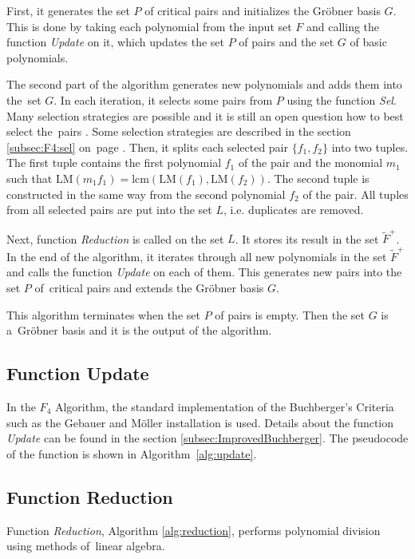 First, it generates the set $P$ of critical pairs and initializes the Gr\"obner basis $G$. This is done by taking each polynomial from the input set $F$ and calling the function \textit{Update} on it, which updates the set $P$ of pairs and the set $G$ of basic polynomials.

The second part of the algorithm generates new polynomials and adds them into the~set $G$. In each iteration, it selects some pairs from $P$ using the function \textit{Sel}. Many selection strategies are possible and it is still an open question how to best select the~pairs \cite{F4}. Some selection strategies are described in the section \ref{subsec:F4:sel} on~page \pageref{subsec:F4:sel}. Then, it splits each selected pair $\{f_1, f_2\}$ into two tuples. The first tuple contains the first polynomial $f_1$ of the pair and the monomial $m_1$ such that $\textrm{LM}(m_1 f_1) = \textrm{lcm}(\textrm{LM}(f_1),\textrm{LM}(f_2))$. The second tuple is constructed in the same way from the second polynomial $f_2$ of the pair. All tuples from all selected pairs are put into the set $L$, i.e. duplicates are removed.

Next, function \textit{Reduction} is called on the set $L$. It stores its result in the set $\tilde{F}^+$. In the end of the algorithm, it iterates through all new polynomials in the set $\tilde{F}^+$ and calls the function \textit{Update} on each of them. This generates new pairs into the set $P$ of~critical pairs and extends the Gr\"obner basis $G$.

This algorithm terminates when the set $P$ of pairs is empty. Then the set $G$ is a~Gr\"obner basis and it is the output of the algorithm.



\subsection{Function Update}
In the $F_4$ Algorithm, the standard implementation of the Buchberger's Criteria such as the Gebauer and M\"oller installation \cite{Gebauer-Moller88} is used. Details about the function \textit{Update} can be found in the section \ref{subsec:ImprovedBuchberger}. The pseudocode of the function is shown in Algorithm~\ref{alg:update}.

\subsection{Function Reduction}
Function \textit{Reduction}, Algorithm \ref{alg:reduction}, performs polynomial division using methods of~linear algebra.

